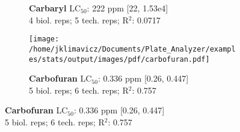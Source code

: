 \documentclass{article}
\begin{document}
\begin{figure}[thp!]
\begin{subfigure}{0.500\textwidth}
      \vspace{-0.05cm}
      \caption*{\textbf{Carbaryl} LC$_{50}$: 222 ppm [22, 1.53e4] \\ 
4 biol. reps; 5 tech. reps; R$^2$: 0.0717}
      \vspace{0.1cm}
   \end{subfigure}%
   \begin{subfigure}{0.500\textwidth}
      \centering
      \texttt{[image: /home/jklimavicz/Documents/Plate\_Analyzer/examples/stats/output/images/pdf/carbofuran.pdf]}
      \vspace{-0.05cm}
      \caption*{\textbf{Carbofuran} LC$_{50}$: 0.336 ppm [0.26, 0.447] \\ 
5 biol. reps; 6 tech. reps; R$^2$: 0.757}
      \vspace{0.1cm}
   \end{subfigure}%
\end{figure}
\clearpage
\pagebreak
\vspace{-0.1cm}
\end{document}
